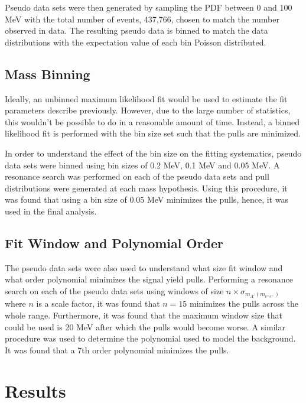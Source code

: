 Pseudo data sets were then generated
by sampling the PDF between 0 and 100 MeV with the total number of
events, 437,766, chosen to match the number observed in data.  The resulting
pseudo data is binned to match the data distributions with the expectation
value of each bin Poisson distributed.


\subsection{Mass Binning}

Ideally, an unbinned maximum likelihood fit would be used to estimate the fit 
parameters describe previously.  However, due to the large number of statistics, 
this wouldn't be possible to do in a reasonable amount of time.  Instead, 
a binned likelihood fit is performed with the bin size set such that the 
pulls are minimized.

In order to understand the effect of the bin size on the fitting systematics, 
pseudo data sets were binned using bin sizes of 0.2 MeV, 0.1 MeV and 0.05 MeV.
A resonance search was performed on each of the pseudo data sets and pull 
distributions were generated at 
each mass hypothesis.
Using this procedure, it was found that using
a bin size of 0.05 MeV minimizes the pulls, hence, it was used in the final
analysis.

\subsection{Fit Window and Polynomial Order}

The pseudo data sets were also used to understand what size fit window and what 
order polynomial minimizes the signal yield pulls. Performing a resonance search on 
each of the pseudo data sets using windows of size $n \times \sigma_{m_{A'}(m_{e^+e^-})}$
where $n$ is a scale factor, it was found that $n = 15$ minimizes the pulls 
across the whole range. Furthermore, it was found that the maximum window
size that could be used is 20 MeV after which the pulls would become worse. 
A similar procedure was used to determine the polynomial used to model the background.
It was found that a 7th order polynomial minimizes the pulls. 

\section{Results}

